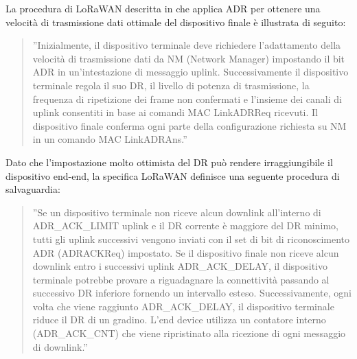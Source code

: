 \documentclass[a4paper]{report} %
\begin{document}
La procedura di LoRaWAN descritta in \cite{art:rif.48} che applica ADR per ottenere una velocità di trasmissione dati ottimale del dispositivo finale è illustrata di seguito:
\begin{quote}
	''Inizialmente, il dispositivo terminale deve richiedere l'adattamento della velocità di trasmissione dati da NM (Network Manager) impostando il bit ADR in un'intestazione di messaggio uplink. Successivamente il dispositivo terminale regola il suo DR, il livello di potenza di trasmissione, la frequenza di ripetizione dei frame non confermati e l'insieme dei canali di uplink consentiti in base ai comandi MAC LinkADRReq ricevuti. Il dispositivo finale conferma ogni parte della configurazione richiesta su NM in un comando MAC LinkADRAns.''
\end{quote}	
Dato che l'impostazione molto ottimista del DR può rendere irraggiungibile il dispositivo end-end, la specifica LoRaWAN definisce una seguente procedura di salvaguardia: 
\begin{quote}
	''Se un dispositivo terminale non riceve alcun downlink all'interno di ADR\_ACK\_LIMIT uplink e il DR corrente è maggiore del DR minimo, tutti gli uplink successivi vengono inviati con il set di bit di riconoscimento ADR (ADRACKReq) impostato. Se il dispositivo finale non riceve alcun downlink entro i successivi uplink ADR\_ACK\_DELAY, il dispositivo terminale potrebbe provare a riguadagnare la connettività passando al successivo DR inferiore fornendo un intervallo esteso. Successivamente, ogni volta che viene raggiunto ADR\_ACK\_DELAY, il dispositivo terminale riduce il DR di un gradino. L'end device utilizza un contatore interno (ADR\_ACK\_CNT) che viene ripristinato alla ricezione di ogni messaggio di downlink.''
\end{quote}
\end{document}
